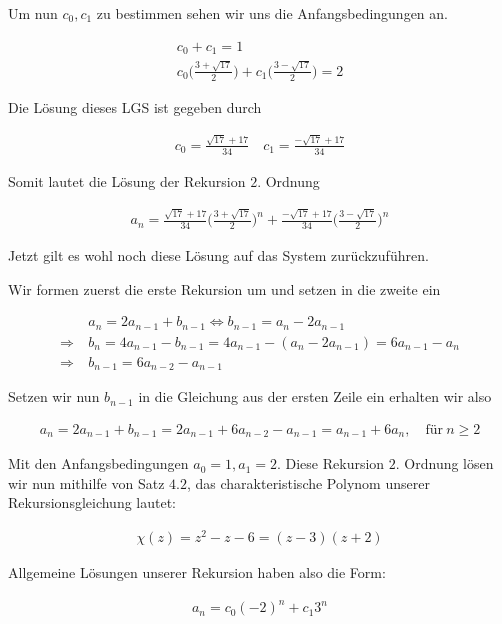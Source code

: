 \begin{solution}
  Um nun $c_0, c_1$ zu bestimmen sehen wir uns die Anfangsbedingungen an.

  \begin{align*}
    c_0 + c_1 = 1 \\
    c_0 \Big(\frac{3 +\sqrt{17}}{2}\Big) + c_1\Big(\frac{3 -\sqrt{17}}{2}\Big) = 2
  \end{align*}

  Die Lösung dieses LGS ist gegeben durch

  \begin{align*}
    c_0 = \frac{\sqrt{17} + 17}{34} \quad
    c_1 = \frac{-\sqrt{17} +17}{34}
  \end{align*}

  Somit lautet die Lösung der Rekursion $2.$ Ordnung

  \begin{align*}
  a_n
  =
  \frac{\sqrt{17} + 17}{34} \Big(\frac{3 +\sqrt{17}}{2}\Big)^n
    + \frac{-\sqrt{17} +17}{34} \Big(\frac{3 -\sqrt{17}}{2}\Big)^n
  \end{align*}

  Jetzt gilt es wohl noch diese Lösung auf das System zurückzuführen.
\end{solution}


\begin{solution}
	Wir formen zuerst die erste Rekursion um und setzen in die zweite ein
	
	\begin{align*}
	&a_n = 2a_{n-1} + b_{n-1}
	\Leftrightarrow
	b_{n-1} = a_n - 2a_{n-1} \\
	\Rightarrow~
	& b_n = 4a_{n-1} - b_{n - 1} = 4a_{n-1} - (a_n - 2a_{n-1}) = 6a_{n-1} - a_n\\
	\Rightarrow~
	&b_{n-1} = 6a_{n-2} - a_{n-1}
	\end{align*}
	
	Setzen wir nun $b_{n-1}$ in die Gleichung aus der ersten Zeile ein erhalten wir also
	
	\begin{align*}
	a_n
	= 2a_{n-1} + b_{n-1} = 2a_{n-1} + 6a_{n-2} - a_{n-1} = a_{n-1} + 6a_n , \quad \text{für}~ n \geq 2
	\end{align*}
	
	Mit den Anfangsbedingungen $a_0 = 1, a_1 = 2$. Diese Rekursion $2.$ Ordnung lösen wir nun mithilfe von Satz $4.2$, das charakteristische Polynom unserer Rekursionsgleichung lautet:
	
	\begin{align*}
	\chi(z)
	=
	z^2 - z -6 = (z - 3)(z + 2)
	\end{align*}
	
	Allgemeine Lösungen unserer Rekursion haben also die Form:
	
	\begin{align*}
	a_n
	=
	c_0 (-2)^n + c_1 3^n
	\end{align*}
	
\end{solution}